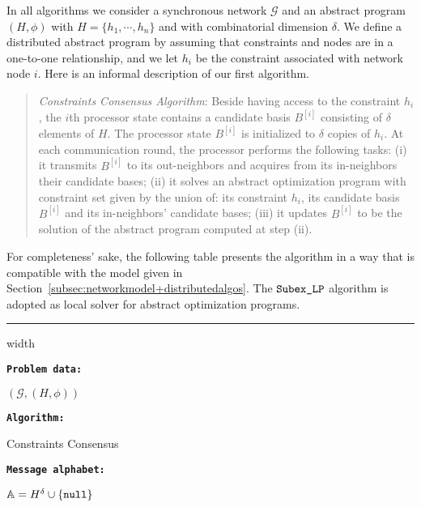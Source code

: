 \documentclass[onecolumn,journal,letterpaper]{IEEEtran}
\newcommand{\union}{\cup}
\newcommand{\alphabet}{\mathbb{A}}
\newcommand{\GG}{\mathcal{G}}
\newcommand{\subexLP}{\textup{\texttt{SUBEX\_lp}}}
\renewcommand{\subexLP}{\textup{\texttt{Subex\_LP}}}
\newcommand{\supind}[2]{{#1}^{[#2]}}
\newcommand{\nll}{\textup{\texttt{null}}\xspace}
\begin{document}
In all algorithms we consider a synchronous network $\GG$ and an abstract
program $(H, \phi)$ with $H = \{h_1, \cdots, h_n\}$ and with combinatorial
dimension $\delta$.  We define a distributed abstract program by assuming
that constraints and nodes are in a one-to-one relationship, and we let
$h_i$ be the constraint associated with network node $i$. Here is an
informal description of our first algorithm.
\begin{quote}
  \emph{Constraints Consensus Algorithm}: Beside having access to the
  constraint $h_i$, the $i$th processor state contains a candidate basis
  $\supind{B}{i}$ consisting of $\delta$ elements of $H$.  The processor
  state $\supind{B}{i}$ is initialized to $\delta$ copies of $h_i$. At each
  communication round, the processor performs the following tasks: (i) it
  transmits $\supind{B}{i}$ to its out-neighbors and acquires from its
  in-neighbors their candidate bases; (ii) it solves an abstract optimization
  program with constraint set given by the union of: its constraint $h_i$,
  its candidate basis $\supind{B}{i}$ and its in-neighbors' candidate
  bases; (iii) it updates $\supind{B}{i}$ to be the solution of the
  abstract program computed at step (ii).
\end{quote}
For completeness' sake, the following table presents the algorithm in a way
that is compatible with the model given in
Section~\ref{subsec:networkmodel+distributedalgos}.  The $\subexLP$
algorithm is adopted as local solver for abstract optimization programs.


\bigskip \hrule width \linewidth \smallskip

\noindent\begin{minipage}{0.44\linewidth}\textbf{\texttt{Problem data:}}\end{minipage}\begin{minipage}{0.56\linewidth}$(\GG,(H,\phi))$\end{minipage}

\noindent\begin{minipage}{0.44\linewidth}\textbf{\texttt{Algorithm:}}\end{minipage}\begin{minipage}{0.56\linewidth}Constraints Consensus\end{minipage}

\noindent\begin{minipage}{0.44\linewidth}\textbf{\texttt{Message alphabet:}}\end{minipage}\begin{minipage}{0.56\linewidth}$\alphabet = H^\delta\union\{\nll\}$\end{minipage}
\end{document}
